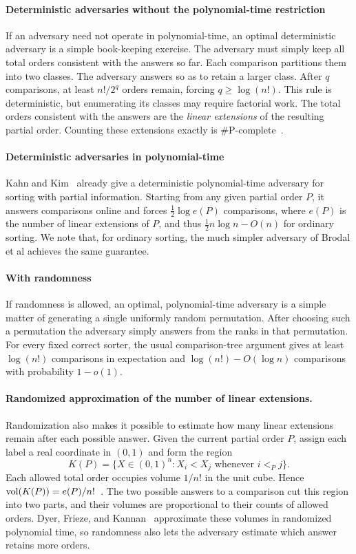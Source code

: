\paragraph{Deterministic adversaries without the polynomial-time restriction}
If an adversary need not operate in polynomial-time, an optimal deterministic adversary is a simple book-keeping exercise.
The adversary must simply keep all total orders consistent with the answers so far. Each comparison
partitions them into two classes. The adversary answers so as to retain a larger class.
After $q$ comparisons, at least $n!/2^q$ orders remain, forcing
$q\ge\log(n!)$. This rule is deterministic, but enumerating its classes
may require factorial work. The total orders consistent with the answers
are the \emph{linear extensions} of the resulting partial order. Counting
these extensions exactly is $\#\mathrm P$-complete~\cite{brightwell}.

\paragraph{Deterministic adversaries in polynomial-time}
Kahn and Kim~\cite{kahn-kim} already give a deterministic polynomial-time
adversary for sorting with partial information. Starting from any given
partial order $P$, it answers comparisons online and forces
$\frac{1}{2}\log e(P)$ comparisons, where $e(P)$ is the number of linear
extensions of $P$, and thus $\frac{1}{2}n \log n-O(n)$ for ordinary sorting.
We note that, for ordinary sorting, the much simpler adversary of Brodal et al \cite{brodal} achieves the same guarantee.

\paragraph{With randomness}
If randomness is allowed, an optimal, polynomial-time adversary is a simple matter of generating
a single uniformly random permutation.
After choosing such a permutation the adversary simply answers from the ranks in that permutation.
For every fixed correct sorter, the usual comparison-tree argument gives
at least $\log(n!)$ comparisons in expectation and
$\log(n!)-O(\log n)$ comparisons with probability $1-o(1)$.

\paragraph{Randomized approximation of the number of linear extensions.}
Randomization also makes it possible to estimate how many linear extensions
remain after each possible answer. Given the current partial order $P$,
assign each label a real coordinate in $(0,1)$ and form the region
\[
K(P)=\{X\in(0,1)^n:X_i<X_j\text{ whenever }i<_Pj\}.
\]
Each allowed total order occupies volume $1/n!$ in the unit cube. Hence
$\operatorname{vol}(K(P))=e(P)/n!$~\cite{stanley}. The two possible answers to a comparison
cut this region into two parts, and their volumes are proportional to their
counts of allowed orders.
Dyer, Frieze, and Kannan~\cite{dfk} approximate these volumes in
randomized polynomial time, so randomness also lets the adversary
estimate which answer retains more orders.


